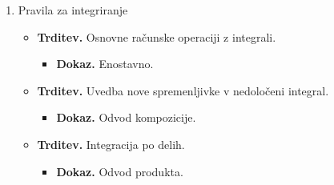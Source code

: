 \begin{enumerate}
    \item Pravila za integriranje
    \begin{itemize}
        \item \colorbox{blue!30}{\textbf{Trditev.}} Osnovne računske operaciji z integrali.
        \begin{itemize}
            \item \colorbox{green!30}{\textbf{Dokaz.}} Enostavno.
        \end{itemize}
        \item \colorbox{blue!30}{\textbf{Trditev.}} Uvedba nove spremenljivke v nedoločeni integral.
        \begin{itemize}
            \item \colorbox{green!30}{\textbf{Dokaz.}} Odvod kompozicije.
        \end{itemize}
        \item \colorbox{blue!30}{\textbf{Trditev.}} Integracija po delih.
        \begin{itemize}
            \item \colorbox{green!30}{\textbf{Dokaz.}} Odvod produkta.
        \end{itemize}
    \end{itemize}
\end{enumerate}

